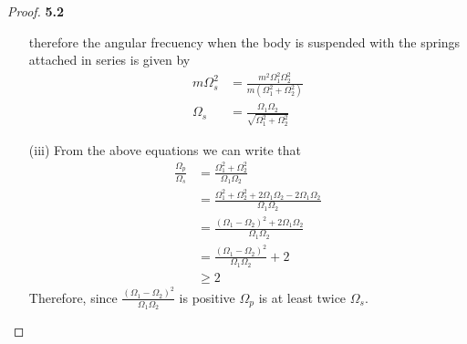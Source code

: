 \documentclass[11pt]{article}
\theoremstyle{definition}
\begin{document}
\begin{proof}{\textbf{5.2}}
\begin{itemize}
        therefore the angular frecuency when the body is suspended with the
        springs attached in series is given by
        \begin{align*}                                
            m\Omega_s^2 &= \frac{m^2\Omega_1^2\Omega_2^2}{m(\Omega_1^2 + \Omega_2^2)} \\
            \Omega_s &= \frac{\Omega_1\Omega_2}{\sqrt{\Omega_1^2 + \Omega_2^2}}
        \end{align*}
        \item [(iii)] From the above equations we can write that
        \begin{align*}
            \frac{\Omega_p}{\Omega_s} &= \frac{\Omega_1^2 + \Omega_2^2}{\Omega_1\Omega_2} \\
                &= \frac{\Omega_1^2 + \Omega_2^2 + 2\Omega_1\Omega_2 -2\Omega_1\Omega_2}{\Omega_1\Omega_2} \\
                &= \frac{(\Omega_1 - \Omega_2)^2 + 2\Omega_1\Omega_2}{\Omega_1\Omega_2} \\
                &= \frac{(\Omega_1 - \Omega_2)^2}{\Omega_1\Omega_2} + 2 \\
                &\geq 2
        \end{align*}
        Therefore, since $\frac{(\Omega_1 - \Omega_2)^2}{\Omega_1\Omega_2}$ is
        positive $\Omega_p$ is at least twice $\Omega_s$. 
    \end{itemize}
    \end{proof}
\end{document}
